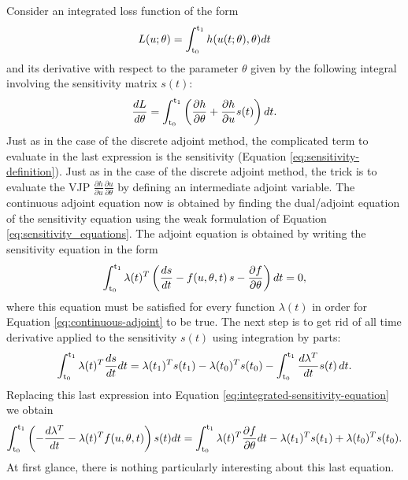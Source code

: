 Consider an integrated loss function of the form 
\begin{equation}
    L(u; \theta) = \operatorname{\int_{t_0}^{t_1}} h(u(t;\theta), \theta) dt
\end{equation}
and its derivative with respect to the parameter $\theta$ given by the following integral involving the sensitivity matrix $s(t)$:
\begin{equation}
    \frac{dL}{d\theta}
    = 
    \operatorname{\int_{t_0}^{t_1}} \left( \frac{\partial h}{\partial \theta} + \frac{\partial h}{\partial u} s(t) \right) dt.
    \label{eq:casa-loss}
\end{equation}
Just as in the case of the discrete adjoint method, the complicated term to evaluate in the last expression is the sensitivity (Equation \eqref{eq:sensitivity-definition}).
Just as in the case of the discrete adjoint method, the trick is to evaluate the VJP $\frac{\partial h}{\partial u} \frac{\partial u}{\partial \theta}$ by defining an intermediate adjoint variable. 
The continuous adjoint equation now is obtained by finding the dual/adjoint equation of the sensitivity equation using the weak formulation of Equation \eqref{eq:sensitivity_equations}. 
The adjoint equation is obtained by writing the sensitivity equation in the form 
\begin{equation}
    \operatorname{\int_{t_0}^{t_1}} \lambda(t)^T \left( \frac{ds}{dt} - f(u, \theta, t) \, s - \frac{\partial f}{\partial \theta}  \right) dt 
    = 
    0,
    \label{eq:integrated-sensitivity-equation}
\end{equation}
where this equation must be satisfied for every function $\lambda(t)$ in order for Equation \eqref{eq:continuous-adjoint} to be true. 
The next step is to get rid of all time derivative applied to the sensitivity $s(t)$ using integration by parts: 
\begin{equation}
    \operatorname{\int_{t_0}^{t_1}} \lambda(t)^T \frac{ds}{dt} dt
    = 
    \lambda(t_1)^T s(t_1) - \lambda(t_0)^T s(t_0)
    -
    \operatorname{\int_{t_0}^{t_1}} \frac{d\lambda^T}{dt} s(t)\, dt.
\end{equation}
Replacing this last expression into Equation \eqref{eq:integrated-sensitivity-equation} we obtain 
\begin{equation}
    \operatorname{\int_{t_0}^{t_1}} \left( - \frac{d\lambda^T}{dt} -  \lambda(t)^T f(u, \theta, t) \right) s(t) dt
    =
    \operatorname{\int_{t_0}^{t_1}} \lambda(t)^T \frac{\partial f}{\partial \theta} dt 
    - 
    \lambda(t_1)^T s(t_1)
    + 
    \lambda(t_0)^T s(t_0).
    \label{eq:casa-semiadjoint}
\end{equation}
At first glance, there is nothing particularly interesting about this last equation. 
